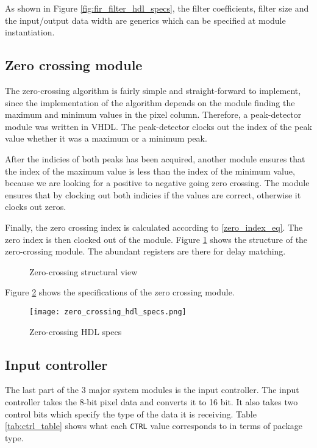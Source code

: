 As shown in Figure \ref{fig:fir_filter_hdl_specs}, the filter coefficients, filter size and the input/output data width are generics which can be specified at module instantiation.

\subsection{Zero crossing module}

The zero-crossing algorithm is fairly simple and straight-forward to implement, since the implementation of the algorithm depends on the module finding the maximum and minimum values in the pixel column. Therefore, a peak-detector module was written in VHDL. The peak-detector clocks out the index of the peak value whether it was a maximum or a minimum peak.

After the indicies of both peaks has been acquired, another module ensures that the index of the maximum value is less than the index of the minimum value, because we are looking for a positive to negative going zero crossing. The module ensures that by clocking out both indicies if the values are correct, otherwise it clocks out zeros.

Finally, the zero crossing index is calculated according to \eqref{zero_index_eq}. The zero index is then clocked out of the module. Figure \ref{fig:zero_crossing_final} shows the structure of the zero-crossing module. The abundant registers are there for delay matching.


\begin{figure}[h]
    \centering
    
    \caption{Zero-crossing structural view}
    \label{fig:zero_crossing_final}
\end{figure}

Figure \ref{fig:zero_crossing_hdl_specs} shows the specifications of the zero crossing module.


\begin{figure}[h]
    \centering
    \texttt{[image: zero\_crossing\_hdl\_specs.png]}
    \caption{Zero-crossing HDL specs}
    \label{fig:zero_crossing_hdl_specs}
\end{figure}

\subsection{Input controller}

The last part of the 3 major system modules is the input controller. The input controller takes the 8-bit pixel data and converts it to 16 bit. It also takes two control bits which specify the type of the data it is receiving. Table \ref{tab:ctrl_table} shows what each \texttt{CTRL} value corresponds to in terms of package type.

